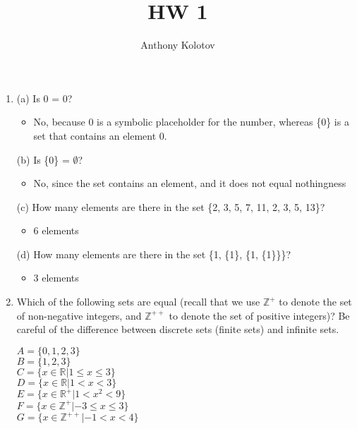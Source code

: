 \documentclass[english,12pt,legalpaper]{article}
\title{HW 1}
\author{Anthony Kolotov}
\begin{document}
	\maketitle


\begin{enumerate}
	\item 
		\begin{flushleft}
			(a) Is 0 = {0}? \\
			\begin{itemize}
				\item No, because 0 is a symbolic placeholder for the number, whereas \{0\} is a set that contains an element 0.
			\end{itemize}
			(b) Is \{0\} = $\emptyset$? \\
			\begin{itemize}
				\item No, since the set contains an element, and it does not equal nothingness 	
			\end{itemize}
			(c) How many elements are there in the set \{2, 3, 5, 7, 11, 2, 3, 5, 13\}? \\
			\begin{itemize}
				\item 6 elements 
			\end{itemize}
			(d) How many elements are there in the set \{1, \{1\}, \{1, \{1\}\}\}?\\
			\begin{itemize}
				\item 3 elements
			\end{itemize}
		\end{flushleft}
		
	\item Which of the following sets are equal (recall that we use $\mathbb{Z^+}$ to denote the set of non-negative integers,
	and $\mathbb{Z^{++}}$ to denote the set of positive integers)? Be careful of the difference between discrete sets (finite sets) and infinite sets.

		\begin{flushleft}
	$A = \{0, 1, 2, 3\}$ \\
	$B = \{1, 2, 3\}$ \\ 
	$C = \{x \in  \mathbb{R} | 1 \leq x \leq 3\}$ \\
	$D = \{x \in  \mathbb{R} | 1 < x < 3\}$ \\
	$E = \{x \in  \mathbb{R}^{+} | 1 < x^2 < 9\}$ \\
	$F = \{x \in \mathbb{Z}^{+} | -3 \leq x \leq 3\}$ \\	
	$G = \{x \in \mathbb{Z}^{++} | -1 < x < 4\}$
		\end{flushleft}
		

\end{enumerate}
\end{document}
